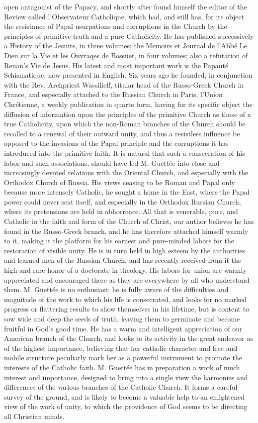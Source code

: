 open antagonist of the Papacy, and shortly after found himself the editor of the Review called l'Observateur Catholique, which had, and still has, for its object the resistance of Papal usurpations and corruptions in the Church by the principles of primitive truth and a pure Catholicity. He has published successively a History of the Jesuits, in three volumes; the Memoirs et Journal de l'Abbé Le Dieu sur la Vie et les Ouvraqes de Bossuet, in four volumes; also a refutation of Renan's Vie de Jesus. His latest and most important work is the Papauté Schismatique, now presented in English. Six years ago he founded, in conjunction with the Rev. Archpriest Wassilieff, titular head of the Russo-Greek Church in France, and especially attached to the Russian Church in Paris, l'Union Chrétienne, a weekly publication in quarto form, having for its specific object the diffusion of information upon the principles of the primitive Church as those of a true Catholicity, upon which the non-Roman branches of the Church should be recalled to a renewal of their outward unity, and thus a resistless influence be opposed to the invasions of the Papal principle and the corruptions it has introduced into the primitive faith. It is natural that such a consecration of his labor and such associations, should have led M. Guettée into close and increasingly devoted relations with the Oriental Church, and especially with the Orthodox Church of Russia. His views ceasing to be Roman and Papal only because more intensely Catholic, he sought a home in the East, where the Papal power could never seat itself, and especially in the Orthodox Russian Church, where its pretensions are held in abhorrence. All that is venerable, pure, and Catholic in the faith and form of the Church of Christ, our author believes he has found in the Russo-Greek branch, and he has therefore attached himself warmly to it, making it the platform for his earnest and pure-minded labors for the restoration of visible unity. He is in turn held in high esteem by the authorities and learned men of the Russian Church, and has recently received from it the high and rare honor of a doctorate in theology. His labors for union are warmly appreciated and encouraged there as they are everywhere by all who understand them. M. Guettée is no enthusiast; he is fully aware of the difficulties and magnitude of the work to which his life is consecrated, and looks for no marked progress or flattering results to show themselves in his lifetime, but is content to sow wide and deep the seeds of truth, leaving them to germinate and become fruitful in God's good time. He has a warm and intelligent appreciation of our American branch of the Church, and looks to its activity in the great endeavor as of the highest importance, believing that her catholic character and free and mobile structure peculiarly mark her as a powerful instrument to promote the interests of the Catholic faith. M. Guettée has in preparation a work of much interest and importance, designed to bring into a single view the harmonies and differences of the various branches of the Catholic Church. It forms a careful survey of the ground, and is likely to become a valuable help to an enlightened view of the work of unity, to which the providence of God seems to be directing all Christian minds. 